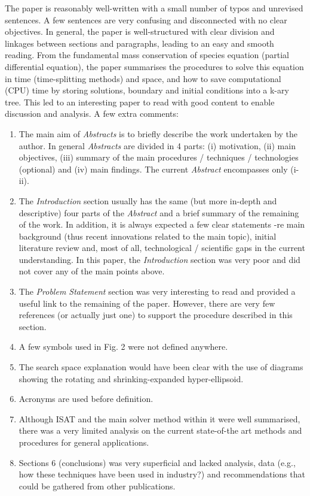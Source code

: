 \documentclass[14pt,twoside]{report}
\begin{document}
The paper is reasonably well-written with a small number of typos and unrevised sentences. A few sentences are very confusing and disconnected with no clear objectives. In general, the paper is well-structured with clear division and linkages between sections and paragraphs, leading to an easy and smooth reading. From the fundamental mass conservation of species equation (partial differential equation), the paper summarises the procedures to solve this equation in time (time-splitting methods) and space, and how to save computational (CPU) time by storing solutions, boundary and initial conditions into a k-ary tree. This led to an interesting paper to read with good content to enable discussion and analysis. A few extra comments:
\begin{enumerate}
\item The main aim of {\it Abstracts} is to briefly describe the work undertaken by the author. In general {\it Abstracts} are divided in 4 parts: (i) motivation, (ii) main objectives, (iii) summary of the main procedures / techniques / technologies (optional) and (iv) main findings. The current {\it Abstract} encompasses only (i-ii).
%
\item The {\it Introduction} section usually has the same (but more in-depth and descriptive) four parts of the {\it Abstract} and a brief summary of the remaining of the work. In addition, it is always expected a few clear statements -re main background (thus recent innovations related to the main topic), initial literature review and, most of all, technological / scientific gaps in the current understanding. In this paper, the {\it Introduction} section was very poor and did not cover any of the main points above.
%
\item The {\it Problem Statement} section was very interesting to read and provided a useful link to the remaining of the paper. However, there are very few references (or actually just one) to support the procedure described in this section.
%
\item A few symbols used in Fig. 2 were not defined anywhere.
%
\item The search space explanation would have been clear with the use of diagrams showing the rotating and  shrinking-expanded hyper-ellipsoid.
%
\item Acronyms are used before definition.
%
\item Although ISAT and the main solver method within it were well summarised, there was a very limited analysis on the current state-of-the art methods and procedures for general applications.  
%
\item Sections 6 (conclusions) was very superficial and lacked analysis, data (e.g., how these techniques have been used in industry?) and recommendations that could be gathered from other publications. 
\end{enumerate}
\end{document}

